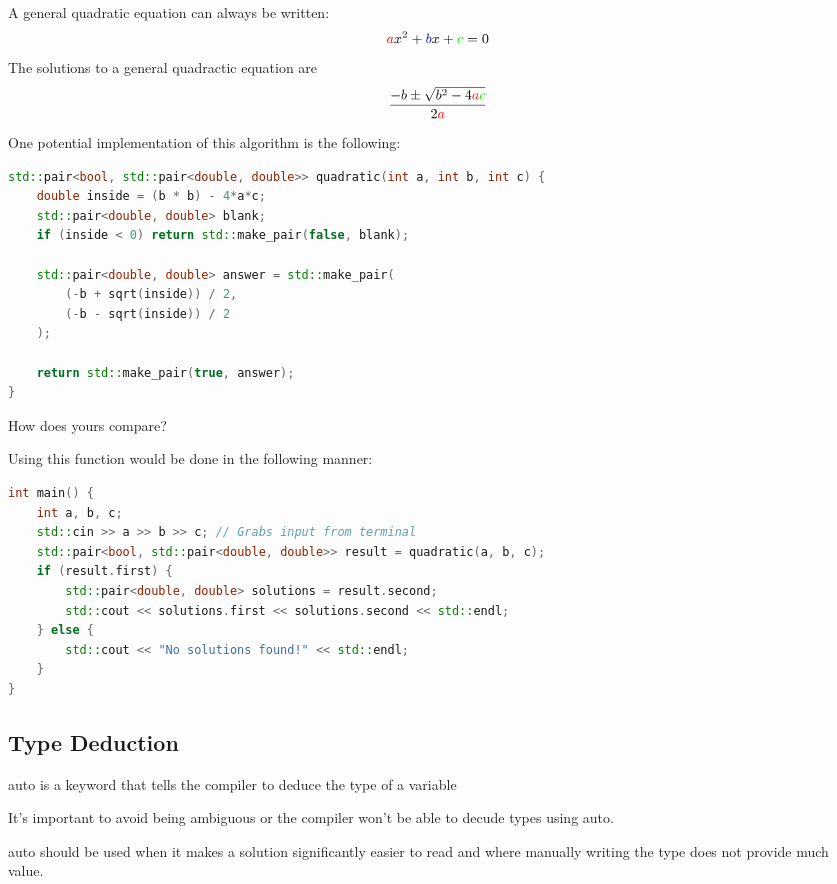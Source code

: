 \documentclass[]{article}
\begin{document}
\begin{exercise}
A general quadratic equation can always be written:
\[
    \textcolor{red}{a}x^2+\textcolor{blue}{b}x+\textcolor{green}{c}=0
\]
The solutions to a general quadractic equation are
\[
    \frac{
        -b\pm \sqrt{b^2-4\textcolor{red}{a}\textcolor{green}{c}}
    }{2\textcolor{red}{a}}
\]
\end{exercise}
\begin{solution}
One potential implementation of this algorithm is the following:
\begin{lstlisting}[language=C++]
std::pair<bool, std::pair<double, double>> quadratic(int a, int b, int c) {
    double inside = (b * b) - 4*a*c;
    std::pair<double, double> blank;
    if (inside < 0) return std::make_pair(false, blank);

    std::pair<double, double> answer = std::make_pair(
        (-b + sqrt(inside)) / 2,
        (-b - sqrt(inside)) / 2
    );

    return std::make_pair(true, answer);
}
\end{lstlisting}
How does yours compare?

Using this function would be done in the following manner:
\begin{lstlisting}[language=C++]
int main() {
    int a, b, c;
    std::cin >> a >> b >> c; // Grabs input from terminal
    std::pair<bool, std::pair<double, double>> result = quadratic(a, b, c);
    if (result.first) {
        std::pair<double, double> solutions = result.second;
        std::cout << solutions.first << solutions.second << std::endl;
    } else {
        std::cout << "No solutions found!" << std::endl;
    }
}
\end{lstlisting}
\end{solution}

\subsection{Type Deduction}

\begin{definition}
    auto is a keyword that tells the compiler to deduce the type of a variable
\end{definition}

It's important to avoid being ambiguous or the compiler won't be able to decude types using auto.

auto should be used when it makes a solution significantly easier to read and where manually writing the type does not provide much value.
\end{document}

